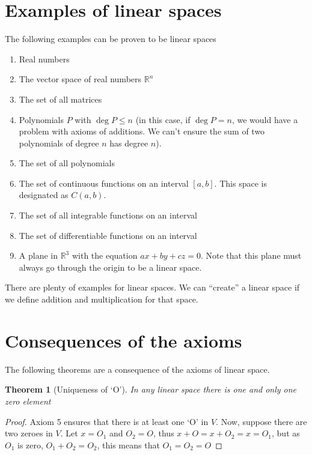 \documentclass{book}
\newtheorem{theorem}{Theorem}[chapter]
\begin{document}
\section{Examples of linear spaces}

The following examples can be proven to be linear spaces

\begin{enumerate}
    \item Real numbers
    \item The vector space of real numbers $\mathbb R^n$
    \item The set of all matrices
    \item Polynomials $P$ with $\deg P \leq n$ (in this case, if $\deg P = n$, we would
          have a problem with axioms of additions. We can't ensure the sum of two
          polynomials of degree $n$ has degree $n$).
    \item The set of all polynomials
    \item The set of continuous functions on an interval $\left[a, b\right]$. This space
          is designated as $C(a,b)$.
    \item The set of all integrable functions on an interval
    \item The set of differentiable functions on an interval
    \item A plane in $\mathbb R^3$ with the equation $ax+by+cz=0$. Note that this plane
          must always go through the origin to be a linear space.
\end{enumerate}

There are plenty of examples for linear spaces. We can ``create'' a linear
space if we define addition and multiplication for that space.

\section{Consequences of the axioms}

The following theorems are a consequence of the axioms of linear space.

\begin{theorem}[Uniqueness of `O']
    In any linear space there is one and only one zero element
\end{theorem}

\begin{proof}
    Axiom 5 ensures that there is at least one `O' in $V$. Now,
    suppose there are two zeroes in $V$. Let $x = O_1$ and $O_2 = O$,
    thus $x + O = x + O_2 = x = O_1$, but as $O_1$ is zero, $O_1 + O_2 = O_2$,
    this means that $O_1=O_2=O$
\end{proof}
\end{document}
